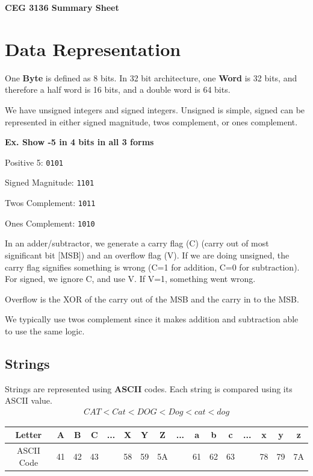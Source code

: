 \documentclass[12pt,letterpaper]{article} \usepackage{amsmath} \usepackage{graphicx} \usepackage[margin=1in]{geometry} \usepackage{longtable}  \usepackage{amssymb}
\begin{document}
	
	\begin{center}
		\Large\textbf{CEG 3136 Summary Sheet} \\
		\vspace{0.5em}
	\end{center}	
	
	\section{Data Representation}
	One \textbf{Byte} is defined as 8 bits. In 32 bit architecture, one \textbf{Word} is 32 bits, and therefore a half word is 16 bits, and a double word is 64 bits. 
	
	We have unsigned integers and signed integers. Unsigned is simple, signed can be represented in either signed magnitude, twos complement, or ones complement. 
	
	\begin{mdframed}
		\textbf{Ex. Show -5 in 4 bits in all 3 forms}
		
		Positive 5: \verb*|0101|
		
		Signed Magnitude: \verb*|1101|
		
		Twos Complement: \verb|1011|
		
		Ones Complement: \verb*|1010|
	\end{mdframed}
	
	In an adder/subtractor, we generate a carry flag (C) (carry out of most significant bit [MSB]) and an overflow flag (V). If we are doing unsigned, the carry flag signifies something is wrong (C=1 for addition, C=0 for subtraction). For signed, we ignore C, and use V. If V=1, something went wrong. 
	
	Overflow is the XOR of the carry out of the MSB and the carry in to the MSB. 
	
	We typically use twos complement since it makes addition and subtraction able to use the same logic. 
	
	\subsection{Strings}
	Strings are represented using \textbf{ASCII} codes. Each string is compared using its ASCII value. 
	\begin{align*}
		CAT < Cat < DOG < Dog < cat < dog
	\end{align*} 
	\begin{center}
		\begin{tabular}{|c||c|c|c|c|c|c|c|c|c|c|c|c|c|c|c|}
			\hline
			Letter & A & B & C & ... & X & Y & Z & ...  & a & b & c & ... & x & y & z \\
			\hline
			ASCII Code & 41 & 42 & 43 &  & 58 & 59 & 5A &  & 61 & 62 & 63 &  & 78 & 79 & 7A \\
			\hline
		\end{tabular}
	\end{center}
\end{document}
